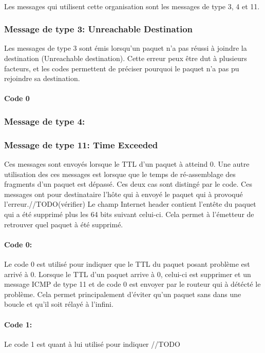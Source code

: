 \documentclass[twoside,openright,a4paper,11pt,french]{article}
\begin{document}
\\Les messages qui utilisent cette organisation sont les messages de type 3, 4 et 11.

\subsubsection{Message de type 3: Unreachable Destination}
Les messages de type 3 sont émis lorsqu'un paquet n'a pas réussi à joindre la destination (Unreachable destination). Cette erreur peux être dut à plusieurs facteurs, et les codes permettent de préciser pourquoi le paquet n'a pas pu rejoindre sa destination.
\paragraph{Code 0}

\subsubsection{Message de type 4:}

\subsubsection{Message de type 11: Time Exceeded}
Ces messages sont envoyés lorsque le TTL d'un paquet à atteind 0. Une autre utilisation des ces messages est lorsque que le temps de ré-assemblage des fragments d'un paquet est dépassé. Ces deux cas sont distingé par le code. Ces messages ont pour destinataire l'hôte qui à envoyé le paquet qui à provoqué l'erreur.//TODO(vérifier)
Le champ Internet header contient l'entête du paquet qui a été supprimé plus les 64 bits suivant celui-ci. Cela permet à l'émetteur de retrouver quel paquet à été supprimé.
\paragraph{Code 0:}
Le code 0 est utilisé pour indiquer que le TTL du paquet posant problème est arrivé à 0. Lorsque le TTL d'un paquet arrive à 0, celui-ci est supprimer et un message ICMP de type 11 et de code 0 est envoyer par le routeur qui à détécté le problème. Cela permet principalement d'éviter qu'un paquet sans dans une boucle et qu'il soit rélayé à l'infini.
\paragraph{Code 1:}
Le code 1 est quant à lui utilisé pour indiquer //TODO
\end{document}
